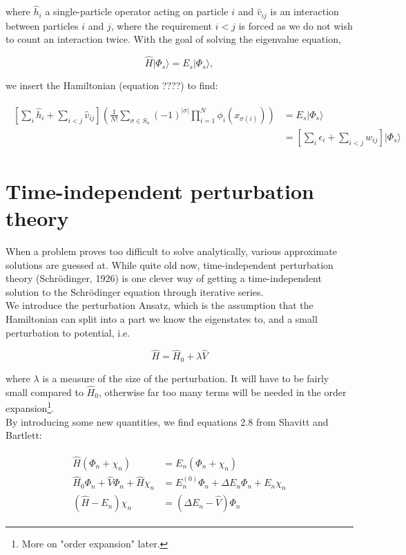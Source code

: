 \documentclass[10pt]{report}
\begin{document}
	where $\hat{h}_i$ a single-particle operator acting on particle $i$ and $\hat{v}_{ij}$ is an interaction between particles $i$ and $j$, where the requirement $i<j$ is forced as we do not wish to count an interaction twice. With the goal of solving the eigenvalue equation,
	
	\begin{equation}
		\hat{H}|\Phi_s\rangle = E_s|\Phi_s\rangle,
	\end{equation}
	
	we insert the Hamiltonian (equation ????)  to find:
	
	\begin{align}
		\begin{split}
		\left[\sum_i \hat{h}_i + \sum_{i<j} \hat{v}_{ij}\right]\left( \frac{1}{N!} \sum_{\sigma\in S_n}(-1)^{|\sigma|}\prod_{i=1}^{N}\phi_i(x_{\sigma(i)})\right) &= E_s|\Phi_s\rangle\\
		&= \left[\sum_i \epsilon_i + \sum_{i<j} w_{ij}\right]|\Phi_s\rangle
		\end{split}
	\end{align}
	
	\section{Time-independent perturbation theory}
	When a problem proves too difficult to solve analytically, various approximate solutions are guessed at. While quite old now, time-independent perturbation theory (Schr\"odinger, 1926) is one clever way of getting a time-independent solution to the Schr\"odinger equation through iterative series.\\
	We introduce the perturbation Ansatz, which is the assumption that the Hamiltonian can split into a part we know the eigenstates to, and a small perturbation to potential, i.e.
	
	\begin{equation}
	\hat{H} = \hat{H}_0 + \lambda\hat{V}
	\end{equation}
	
	where $\lambda$ is a measure of the size of the perturbation. It will have to be fairly small compared to $\hat{H}_0$, otherwise far too many terms will be needed in the order expansion\footnote{More on "order expansion" later.}.\\
	By introducing some new quantities, we find equations 2.8 from Shavitt and Bartlett:
	
	\begin{align}
		\begin{split}
			\hat{H}(\Phi_n + \chi_n) &= E_n(\Phi_n+\chi_n)\\
			\hat{H}_0\Phi_n + \hat{V}\Phi_n + \hat{H}\chi_n &= E_n^{(0)}\Phi_n + \Delta E_n\Phi_n + E_n\chi_n\\
			(\hat{H}-E_n)\chi_n &= (\Delta E_n - \hat{V})\Phi_n
		\end{split}
		\label{MBQM | eq | PT general energy equations}
	\end{align}
	
\end{document}
